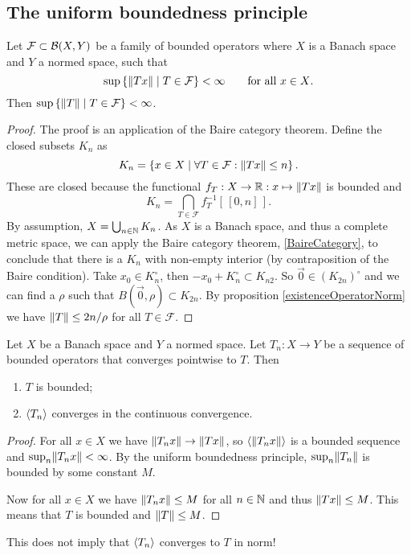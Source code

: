\subsection{The uniform boundedness principle}
\begin{theorem} \label{uniformBoundednessPrinciple}
Let $\mathcal{F}\subset \operatorname{\mathcal{B}}(X,Y)$ be a family of bounded operators where $X$ is a Banach space and $Y$ a normed space, such that
\[ \sup\left\{ \lVert Tx\rVert \;\middle|\; T\in\mathcal{F} \right\} < \infty \qquad \text{for all $x\in X$}. \]
Then $\sup\left\{ \lVert T\rVert \;\middle|\; T\in\mathcal{F} \right\} < \infty$.
\end{theorem}
\begin{proof}
The proof is an application of the Baire category theorem. Define the closed subsets $K_n$ as
\[ K_n = \left\{ x\in X \;\middle|\; \forall T\in\mathcal{F}: \lVert Tx\rVert\leq n \right\}. \]
These are closed because the functional $f_T: X\to \mathbb{R}: x\mapsto \lVert Tx\rVert$ is bounded and
\[ K_n = \bigcap_{T\in\mathcal{F}}f_T^{-1}[\,[0,n]\,]. \]
By assumption, $X=\bigcup_{n\in\mathbb{N}} K_n$. As $X$ is a Banach space, and thus a complete metric space, we can apply the Baire category theorem, \ref{BaireCategory}, to conclude that there is a $K_n$ with non-empty interior (by contraposition of the Baire condition). Take $x_0\in K_n^\circ$, then $-x_0+K_n^\circ \subset K_{n2}$. So $\vec{0}\in (K_{2n})^\circ$ and we can find a $\rho$ such that $B(\vec{0},\rho)\subset K_{2n}$. By proposition \ref{existenceOperatorNorm} we have $\lVert T\rVert\leq 2n/\rho$ for all $T\in\mathcal{F}$.
\end{proof}
\begin{corollary} \label{BanachSteinhaus}
Let $X$ be a Banach space and $Y$ a normed space. Let $T_n: X\to Y$ be a sequence of bounded operators that converges pointwise to $T$. Then
\begin{enumerate}
\item $T$ is bounded;
\item $\left\langle T_n \right\rangle$ converges in the continuous convergence.
\end{enumerate}
\end{corollary}
\begin{proof}
For all $x\in X$ we have $\lVert T_nx\rVert \to \lVert Tx\rVert$, so $\left\langle \lVert T_nx\rVert \right\rangle$ is a bounded sequence and $\sup_{n}\lVert T_nx\rVert <\infty$. By the uniform boundedness principle, $\sup_{n}\lVert T_n\rVert$ is bounded by some constant $M$.

Now for all $x\in X$ we have $\lVert T_nx\rVert \leq M$ for all $n\in\mathbb{N}$ and thus $\lVert Tx\rVert\leq M$. This means that $T$ is bounded and $\lVert T\rVert \leq M$.
\end{proof}
This does not imply that $\left\langle T_n \right\rangle$ converges to $T$ in norm!

